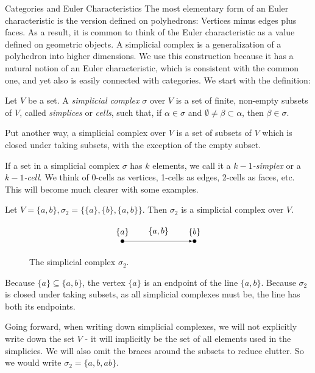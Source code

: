 \documentclass[12pt]{pom_thesis}
\begin{document}
\begin{chapter}{Categories and Euler Characteristics}
The most elementary form of an Euler characteristic is the version defined on polyhedrons: Vertices minus edges plus faces. As a result, it is common to think of the Euler characteristic as a value defined on geometric objects. A simplicial complex is a generalization of a polyhedron into higher dimensions. We use this construction because it has a natural notion of an Euler characteristic, which is consistent with the common one, and yet also is easily connected with categories. We start with the definition:

\begin{defn}
Let $V$ be a set. A \emph{simplicial complex} $\sigma$ over $V$ is a set of finite, non-empty subsets of $V$, called \emph{simplices} or \emph{cells}, such that, if $\alpha \in \sigma$ and $\emptyset \neq \beta \subset \alpha$, then $\beta \in \sigma$.
\end{defn}

Put another way, a simplicial complex over $V$  is a set of subsets of $V$ which is closed under taking subsets, with the exception of the empty subset. 

If a set in a simplicial complex $\sigma$ has $k$ elements, we call it a \emph{$k-1$-simplex} or a \emph{$k-1$-cell}. We think of 0-cells as vertices, 1-cells as edges, 2-cells as faces, etc. This will become much clearer with some examples.
\begin{examp}
Let $V=\{a,b\}, \sigma_2 = \{\{a\},\{b\}, \{a,b\}\}$. Then $\sigma_2$ is a simplicial complex over $V$. 
\begin{figure}[h]
\[
\begin{tikzpicture}[auto, node distance = 3cm, main node/.style={dot}]

\node[label = above:{$\{a\}$}, circle, draw, fill=black,
                        inner sep=0pt, minimum width=4pt](1) at (0,0) {};
\node[label = above:{$\{b\}$}, circle, draw, fill=black,
                        inner sep=0pt, minimum width=4pt](2) at (3,0) {};

\draw[-latex] (1) -- (2) node[midway, above = 3pt] {$\{a,b\}$};

\end{tikzpicture}\]
\caption{The simplicial complex $\sigma_2$.}
\end{figure}
Because $\{a\} \subseteq \{a,b\}$, the vertex $\{a\}$ is an endpoint of the line $\{a,b\}$. Because $\sigma_2$ is closed under taking subsets, as all simplicial complexes must be, the line has both its endpoints.
\end{examp}
Going forward, when writing down simplicial complexes, we will not explicitly write down the set $V$ - it will implicitly be the set of all elements used in the simplicies. We will also omit the braces around the subsets to reduce clutter. So we would write $\sigma_2 = \{a,b,ab\}$.


\end{chapter}
\end{document}
